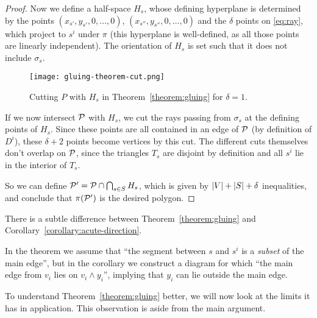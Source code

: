 \begin{proof}
  Now we define a half-space $H_s$, whose defining hyperplane is determined by the points $(x_{s'},y_{s'},0,\dots,0)$, $(x_{s''},y_{s''},0,\dots,0)$ and the $\delta$ points on \eqref{eq:ray}, which project to $s^i$ under $\pi$ (this hyperplane is well-defined, as all those points are linearly independent). The orientation of $H_s$ is set such that it does not include $\sigma_s$.

  \begin{figure}[ht]
    \centering
    \texttt{[image: gluing-theorem-cut.png]}
    \caption{Cutting $P$ with $H_s$ in Theorem~\ref{theorem:gluing} for $\delta = 1$.}
    \label{fig:gluing-theorem-cut}
  \end{figure}

  If we now intersect $\P$ with $H_s$, we cut the rays passing from $\sigma_s$ at the defining points of $H_s$. Since these points are all contained in an edge of $\P$ (by definition of $D^i$), these $\delta + 2$ points become vertices by this cut. The different cuts themselves don't overlap on $\P$, since the triangles $T_s$ are disjoint by definition and all $s^i$ lie in the interior of $T_s$.

  So we can define $\P' = \P \cap \bigcap_{s \in S} H_s$, which is given by $\abs{V}+\abs{S}+\delta$ inequalities, and conclude that $\pi(\P')$ is the desired polygon.
\end{proof}

\begin{remark}\label{remark:pitfall}
  There is a subtle difference between Theorem~\ref{theorem:gluing} and Corollary~\ref{corollary:acute-direction}.

  In the theorem we assume that ``the segment between $s$ and $s^i$ is a \emph{subset} of the main edge'', but in the corollary we construct a diagram for which ``the main edge from $v_i$ lies on $v_i \wedge y_i$'', implying that $y_i$ can lie outside the main edge.
\end{remark}

To understand Theorem~\ref{theorem:gluing} better, we will now look at the limits it has in application. This observation is aside from the main argument.

